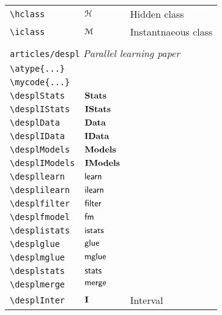 \begin{longtable}{lll}
 {\color[rgb]{0.5,0.5,0.5}\texttt{\textbackslash hclass}} & $\mathcal{H}$ &  Hidden class\\ 
 {\color[rgb]{0.5,0.5,0.5}\texttt{\textbackslash iclass}} & $\mathcal{M}$ &  Instantnaeous class\\ 
  &  & \\ 
 \multicolumn{3}{l}{{\color[rgb]{0.5,0.5,0.5}\texttt{articles/despl}} \emph{Parallel learning paper}}\\ 
 \hline
{\color[rgb]{0.5,0.5,0.5}\texttt{\textbackslash atype\{...\}}} &  & \\ 
 {\color[rgb]{0.5,0.5,0.5}\texttt{\textbackslash mycode\{...\}}} &  & \\ 
 {\color[rgb]{0.5,0.5,0.5}\texttt{\textbackslash desplStats}} & $\mathsf{\bf Stats }$ & \\ 
 {\color[rgb]{0.5,0.5,0.5}\texttt{\textbackslash desplIStats}} & $\mathsf{\bf IStats }$ & \\ 
 {\color[rgb]{0.5,0.5,0.5}\texttt{\textbackslash desplData}} & $\mathsf{\bf Data }$ & \\ 
 {\color[rgb]{0.5,0.5,0.5}\texttt{\textbackslash desplIData}} & $\mathsf{\bf IData }$ & \\ 
 {\color[rgb]{0.5,0.5,0.5}\texttt{\textbackslash desplModels}} & $\mathsf{\bf Models }$ & \\ 
 {\color[rgb]{0.5,0.5,0.5}\texttt{\textbackslash desplIModels}} & $\mathsf{\bf IModels }$ & \\ 
 {\color[rgb]{0.5,0.5,0.5}\texttt{\textbackslash despllearn}} & $\mathsf{learn}$ & \\ 
 {\color[rgb]{0.5,0.5,0.5}\texttt{\textbackslash desplilearn}} & $\mathsf{ilearn}$ & \\ 
 {\color[rgb]{0.5,0.5,0.5}\texttt{\textbackslash desplfilter}} & $\mathsf{filter}$ & \\ 
 {\color[rgb]{0.5,0.5,0.5}\texttt{\textbackslash desplfmodel}} & $\mathsf{fm}$ & \\ 
 {\color[rgb]{0.5,0.5,0.5}\texttt{\textbackslash desplistats}} & $\mathsf{istats}$ & \\ 
 {\color[rgb]{0.5,0.5,0.5}\texttt{\textbackslash desplglue}} & $\mathsf{glue}$ & \\ 
 {\color[rgb]{0.5,0.5,0.5}\texttt{\textbackslash desplmglue}} & $\mathsf{mglue}$ & \\ 
 {\color[rgb]{0.5,0.5,0.5}\texttt{\textbackslash desplstats}} & $\mathsf{stats}$ & \\ 
 {\color[rgb]{0.5,0.5,0.5}\texttt{\textbackslash desplmerge}} & $\mathsf{merge}$ & \\ 
 {\color[rgb]{0.5,0.5,0.5}\texttt{\textbackslash desplInter}} & $\mathsf{\bf I }$ &  Interval\\ 

\end{longtable}
